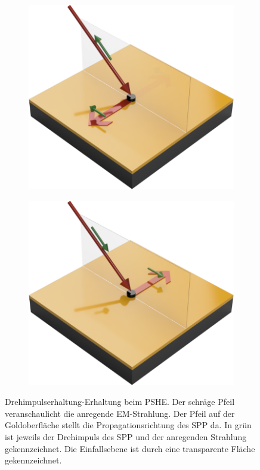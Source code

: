 \documentclass[titlepage,  ngerman]{article}
\begin{document}
	\begin{figure}[h]
		\begin{subfigure}{0.49\textwidth}
			\centering
			\includegraphics[width=\textwidth]{figures/pshe_left.png}
			\caption{}
			\label{fig:pshe_left}
		\end{subfigure}		
		\begin{subfigure}{0.5\textwidth}
			\centering
			\includegraphics[width=\textwidth]{figures/pshe_right.png}
			\caption{}
			\label{fig:pshe_right}
		\end{subfigure}	
		\caption[Drehimpuls-Erhaltung beim PSHE]{Drehimpulserhaltung-Erhaltung beim PSHE. Der schräge Pfeil veranschaulicht die anregende EM-Strahlung. Der Pfeil auf der Goldoberfläche stellt die Propagationsrichtung des SPP da. In grün ist jeweils der Drehimpuls des SPP und der anregenden Strahlung gekennzeichnet. Die Einfallsebene ist durch eine transparente Fläche gekennzeichnet.}
		\label{fig:spin_hall_schema}
	\end{figure}
	\newpage
\end{document}
